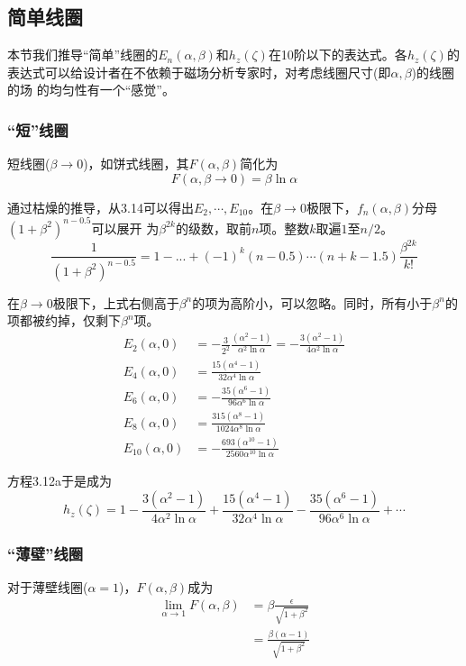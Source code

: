 \subsection{简单线圈}
本节我们推导“简单”线圈的$E_n(\alpha,\beta)$和$h_z(\zeta)$在10阶以下的表达式。各$h_z(\zeta)$的表达式可以给设计者在不依赖于磁场分析专家时，对考虑线圈尺寸(即$\alpha, \beta$)的线圈的场
的均匀性有一个“感觉”。
\subsubsection{“短”线圈}
短线圈($\beta\rightarrow 0 $)，如饼式线圈，其$F(\alpha,\beta)$简化为
\begin{equation}
  F(\alpha,\beta\rightarrow 0)=\beta \ln\alpha
\end{equation}

通过枯燥的推导，从3.14可以得出$E_2,\cdots,E_{10}$。在$\beta\rightarrow 0$极限下，$f_n(\alpha,\beta)$分母$(1+\beta^2)^{n-0.5}$可以展开
为$\beta^{2k}$的级数，取前$n$项。整数$k$取遍$1$至$n/2$。
\begin{equation}
 \frac{1}{(1+\beta^2)^{n-0.5}}=1-...+(-1)^k (n-0.5)\cdots(n+k-1.5)\frac{\beta^{2k}}{k!}
\end{equation}

在$\beta\rightarrow 0$极限下，上式右侧高于$\beta^n$的项为高阶小，可以忽略。同时，所有小于$\beta^n$的项都被约掉，仅剩下$\beta^n$项。
\begin{subequations}
	\begin{align}
  E_2(\alpha,0) &= -\frac{3}{2^2}\frac{(\alpha^2-1)}{\alpha^2 \ln \alpha}=-\frac{3(\alpha^2-1)}{4\alpha^2 \ln \alpha} \\ 
  E_4(\alpha,0) &= \frac{15(\alpha^4-1)}{32\alpha^4 \ln \alpha} \\ 
  E_6(\alpha,0) &= -\frac{35(\alpha^6-1)}{96\alpha^6\ln \alpha} \\ 
  E_8(\alpha,0) &= \frac{315(\alpha^8-1)}{1024\alpha^8 \ln \alpha} \\
    E_{10}(\alpha,0) &= -\frac{693(\alpha^{10}-1)}{2560\alpha^{10} \ln \alpha}
    \end{align}
\end{subequations}

方程3.12a于是成为
\begin{equation}
  h_z(\zeta)=1-\frac{3(\alpha^2-1)}{4\alpha^2 \ln \alpha}+\frac{15(\alpha^4-1)}{32\alpha^4 \ln \alpha} -\frac{35(\alpha^6-1)}{96\alpha^6\ln \alpha}+\cdots
\end{equation}

\subsubsection{“薄壁”线圈}
对于薄壁线圈($\alpha=1$)，$F(\alpha,\beta)$成为
\begin{subequations}
\begin{align}
  \lim_{\alpha\rightarrow 1} F(\alpha,\beta)&=\beta\frac{\epsilon}{\sqrt{1+\beta^2}}\\
  &=\frac{\beta(\alpha-1)}{\sqrt{1+\beta^2}}
\end{align}
\end{subequations}

